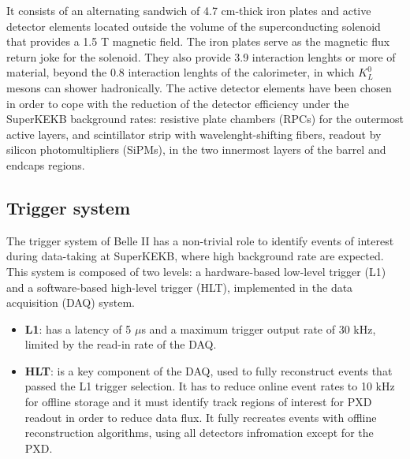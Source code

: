 It consists of an alternating sandwich of 4.7 cm-thick iron plates and active detector elements located outside the volume of the superconducting solenoid that provides a 1.5 T magnetic field. The iron plates serve as the magnetic flux return joke for the solenoid. They also provide 3.9 interaction lenghts or more of material, beyond the 0.8 interaction lenghts of the calorimeter, in which $K_{L}^{0}$ mesons can shower hadronically. The active detector elements have been chosen in order to cope with the reduction of the detector efficiency under the SuperKEKB background rates: resistive plate chambers (RPCs) for the outermost active layers, and scintillator strip with wavelenght-shifting fibers, readout by silicon photomultipliers (SiPMs), in the two innermost layers of the barrel and endcaps regions.

\subsection{Trigger system}

The trigger system of Belle II has a non-trivial role to identify events of interest during data-taking at SuperKEKB, where high background rate are expected. 
This system is composed of two levels: a hardware-based low-level trigger (L1) and a software-based high-level trigger (HLT), implemented in the data acquisition (DAQ) system. 

\begin{itemize}
\item \textbf{L1}: has a latency of 5 $\mu$s and a maximum trigger output rate of 30 kHz, limited by the read-in rate of the DAQ.
\item \textbf{HLT}: is a key component of the DAQ, used to fully reconstruct events that passed the L1 trigger selection. It has to reduce online event rates to 10 kHz for offline storage and it must identify track regions of interest for PXD readout in order to reduce data flux. It fully recreates events with offline reconstruction algorithms, using all detectors infromation except for the PXD.
\end{itemize}


\begin{comment}
\begin{figure}
\centering
\texttt{[image: detector\_summary]}
\caption{}
\label{}
\end{figure}
\end{comment}


